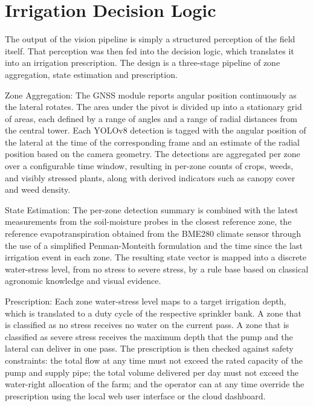 \documentclass[12pt,a4paper]{report}
\begin{document}
\section{Irrigation Decision Logic}

The output of the vision pipeline is simply a structured perception of the field itself. That perception was then fed into the decision logic, which translates it into an irrigation prescription. The design is a three-stage pipeline of zone aggregation, state estimation and prescription.

Zone Aggregation: The GNSS module reports angular position continuously as the lateral rotates. The area under the pivot is divided up into a stationary grid of areas, each defined by a range of angles and a range of radial distances from the central tower. Each YOLOv8 detection is tagged with the angular position of the lateral at the time of the corresponding frame and an estimate of the radial position based on the camera geometry. The detections are aggregated per zone over a configurable time window, resulting in per-zone counts of crops, weeds, and visibly stressed plants, along with derived indicators such as canopy cover and weed density.

State Estimation: The per-zone detection summary is combined with the latest measurements from the soil-moisture probes in the closest reference zone, the reference evapotranspiration obtained from the BME280 climate sensor through the use of a simplified Penman-Monteith formulation and the time since the last irrigation event in each zone. The resulting state vector is mapped into a discrete water-stress level, from no stress to severe stress, by a rule base based on classical agronomic knowledge and visual evidence.

Prescription: Each zone water-stress level maps to a target irrigation depth, which is translated to a duty cycle of the respective sprinkler bank. A zone that is classified as no stress receives no water on the current pass. A zone that is classified as severe stress receives the maximum depth that the pump and the lateral can deliver in one pass. The prescription is then checked against safety constraints: the total flow at any time must not exceed the rated capacity of the pump and supply pipe; the total volume delivered per day must not exceed the water-right allocation of the farm; and the operator can at any time override the prescription using the local web user interface or the cloud dashboard.
\end{document}
